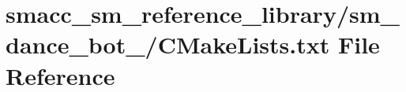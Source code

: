 \hypertarget{sm__reference__library_2sm__dance__bot__2_2CMakeLists_8txt}{}\section{smacc\+\_\+sm\+\_\+reference\+\_\+library/sm\+\_\+dance\+\_\+bot\+\_/\+C\+Make\+Lists.txt File Reference}
\label{sm__reference__library_2sm__dance__bot__2_2CMakeLists_8txt}
